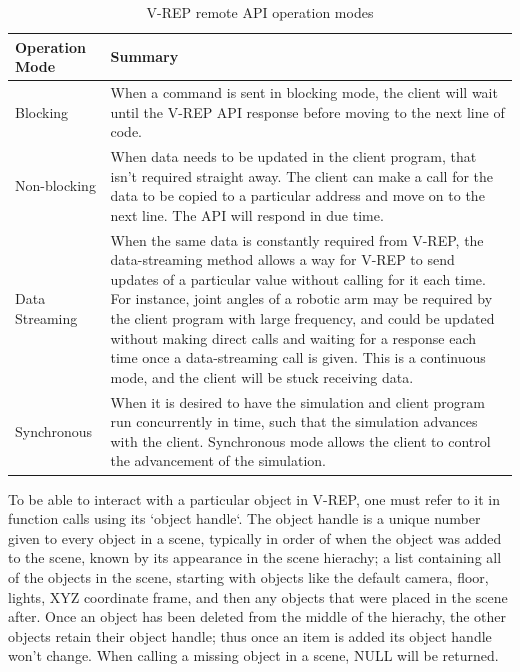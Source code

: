 \documentclass[12pt,openany,a4paper]{book}
\begin{document}
\begin{center}
\begin{table}[htb]


    \begin{tabular}{ | l | p{10cm} |}
    \hline
    Operation Mode & Summary \\ \hline
     Blocking & When a command is sent in blocking mode, the client will wait until the V-REP API response before moving to the next line of code.\\ \hline
    Non-blocking & When data needs to be updated in the client program, that isn't required straight away. The client can make a call for the data to be copied to a particular address and move on to the next line. The API will respond in due time.  \\ \hline
    Data Streaming & When the same data is constantly required from V-REP, the data-streaming method allows a way for V-REP to send updates of a particular value without calling for it each time. For instance, joint angles of a robotic arm may be required by the client program with large frequency, and could be updated without making direct calls and waiting for a response each time once a data-streaming call is given. This is a continuous mode, and the client will be stuck receiving data. \\
    \hline
    Synchronous & When it is desired to have the simulation and client program run concurrently in time, such that the simulation advances with the client. Synchronous mode allows the client to control the advancement of the simulation.\\
    \hline
    \end{tabular}
    \caption{V-REP remote API operation modes}
\end{table}
\end{center}

To be able to interact with a particular object in V-REP, one must refer to it in function calls using its `object handle`. The object handle is a unique number given to every object in a scene, typically in order of when the object was added to the scene, known by its appearance in the scene hierachy; a list containing all of the objects in the scene, starting with objects like the default camera, floor, lights, XYZ coordinate frame, and then any objects that were placed in the scene after. Once an object has been deleted from the middle of the hierachy, the other objects retain their object handle; thus once an item is added its object handle won't change. When calling a missing object in a scene, NULL will be returned.
\end{document}
